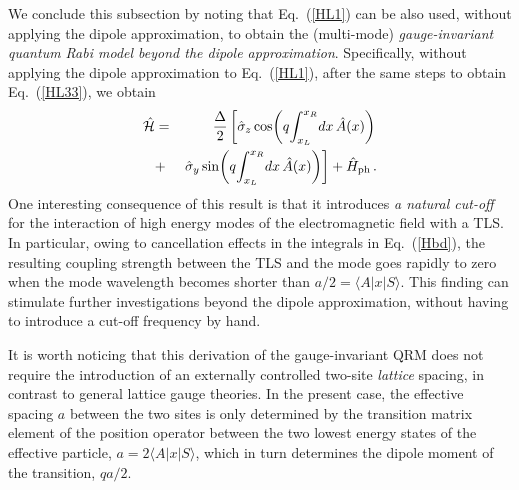 \documentclass[aps,pra,reprint, superscriptaddress,amsmath,showpacs,longbibliography]{revtex4-2}
\renewcommand{\eqref}[1]{\mbox{Eq.~(\ref{#1})}}
\newcommand{\bea}{\begin{eqnarray}}
\newcommand{\eea}{\end{eqnarray}}
\begin{document}
We conclude this subsection by {noting} that \eqref{HL1} can be also used, without applying the dipole approximation, to obtain  the (multi-mode) {\em gauge-invariant quantum Rabi model beyond the dipole approximation}.	
Specifically, without applying the dipole approximation to \eqref{HL1}, after the same steps to obtain \eqref{HL33}, we obtain
\bea
	\hat {\cal H} &=&  \frac{\Delta}{2} \left[ \hat \sigma_z
	\cos\!{\left(q\! \int^{x_R}_{x_L}\! dx\, \hat A(x)\right)} \right. \nonumber \\ &+& \left. \hat \sigma_y \sin\!{\left(q\! \int^{x_R}_{x_L}\! dx\, \hat A(x)\right)}
	\right] 
	+ \hat H_{\rm ph}\, .
\label{Hbd}
\eea
One interesting consequence of this result is that it 
{introduces} {\em a natural cut-off} for the interaction of high energy modes of the electromagnetic field with a TLS. In particular, owing to cancellation effects in the integrals in \eqref{Hbd}, the resulting coupling strength between the TLS and the mode goes rapidly to zero when the mode wavelength becomes shorter than $a/2 = \langle A | x | S \rangle$.
This finding can stimulate further investigations beyond the dipole approximation, without having to introduce a cut-off frequency by hand.


It is worth noticing that  this derivation of the gauge-invariant QRM does not require the introduction of an externally controlled  two-site  {\em lattice} spacing, in contrast to general lattice gauge theories. In the present case, the effective spacing $a$ between the two sites is only determined by the transition matrix element of the position operator between the two lowest energy states of the effective particle, $a = 2 \langle A | x | S \rangle$, which in turn determines the dipole moment of the transition, $q a /2$. 
\end{document}
